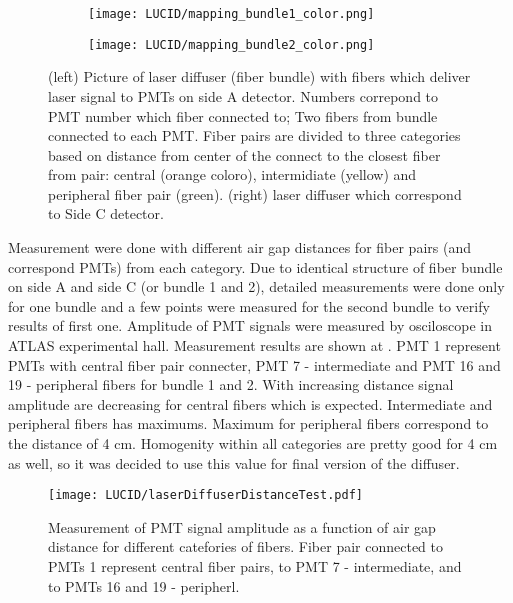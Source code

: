 \begin{figure}
\centering
\begin{subfigure}{.45\textwidth}
  \centering
  \texttt{[image: LUCID/mapping\_bundle1\_color.png]}
\end{subfigure}%
\begin{subfigure}{.45\textwidth}
  \centering
  \texttt{[image: LUCID/mapping\_bundle2\_color.png]}
\end{subfigure}
\caption{(left) Picture of laser diffuser (fiber bundle) with fibers which deliver laser signal to PMTs on side A detector. Numbers correpond to PMT number which fiber connected to; 
	 Two fibers from bundle connected to each PMT. Fiber pairs are divided to three categories based on distance from center of the connect to the closest fiber from pair: 
	 central (orange coloro), intermidiate (yellow) and peripheral fiber pair (green).
	 (right) laser diffuser which correspond to Side C detector.}
\end{figure}

Measurement were done with different air gap distances for fiber pairs (and correspond PMTs) from each category. 
Due to identical structure of fiber bundle on side A and side C (or bundle 1 and 2), detailed measurements
were done only for one bundle and a few points were measured for the second bundle to verify results of first one. Amplitude of PMT signals were measured by osciloscope in 
ATLAS experimental hall. Measurement results are shown at . PMT 1 represent PMTs with central fiber pair connecter, 
PMT 7 - intermediate and PMT 16 and 19 - peripheral fibers for bundle 1 and 2. 
With increasing distance signal amplitude are decreasing for central fibers which is expected. 
Intermediate and peripheral fibers has maximums. Maximum for peripheral fibers correspond to the distance of 4 cm.
Homogenity within all categories are pretty good for 4 cm as well, so it was decided to use this value for final version of the diffuser.



\begin{figure}
\centering
\texttt{[image: LUCID/laserDiffuserDistanceTest.pdf]}
\caption{Measurement of PMT signal amplitude as a function of air gap distance for different catefories of fibers. Fiber pair connected to PMTs 1 represent central fiber pairs, to PMT 7 - intermediate, and to PMTs 16 and 19 - peripherl.}
\label{fig:laserDiffuserDistanceTest}
\end{figure}


